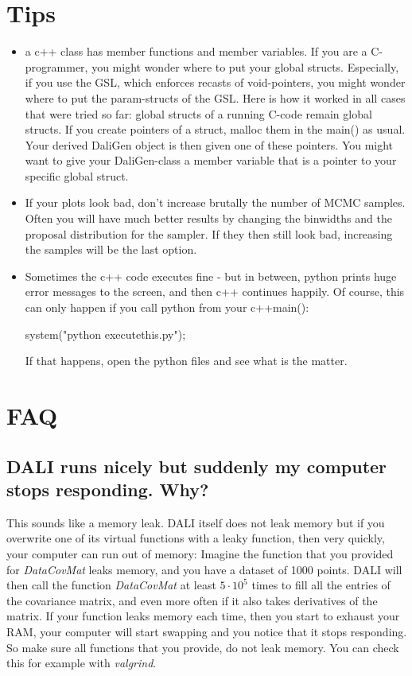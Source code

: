 \documentclass[12pt,twoside]{extarticle}
\newenvironment{file}{\begin{fBox}}{\hfill{\color{dalifile}}\end{fBox}}
\begin{document}
\section{Tips}
\begin{itemize}
\item a c++ class has member functions and member variables. If you are a C-programmer, you might wonder where to put your global structs. Especially, if you use the GSL, which enforces recasts of void-pointers, you might wonder where to put the param-structs of the GSL. Here is how it worked in all cases that were tried so far: global structs of a running C-code remain global structs. If you create pointers of a struct, malloc them in the main() as usual. Your derived DaliGen object is then given one of these pointers. You might want to give your DaliGen-class a member variable that is a pointer to your specific global struct.
 \item If your plots look bad, don't increase brutally the number of MCMC samples. Often you will have much better results by changing the binwidths and the proposal distribution for the sampler. If they then still look bad, increasing the samples will be the last option.
 \item Sometimes the c++ code executes fine - but in between, python prints huge error messages to the screen, and then c++ continues happily. Of course, this can only happen if you call python from your c++main():
 \begin{file}
  system("python executethis.py");
 \end{file}
If that happens, open the python files and see what is the matter.
\end{itemize}


\section{FAQ}

\subsection{DALI runs nicely but suddenly my computer stops responding. Why?}
This sounds like a memory leak. DALI itself does not leak memory but if you overwrite one of its virtual functions with a leaky function, then very quickly, your computer can run out of memory: Imagine the function that you provided for \emph{DataCovMat} leaks memory, and you have a dataset of 1000 points. DALI will then call the function \emph{DataCovMat} at least $5\cdot 10^5$ times to fill all the entries of the covariance matrix, and even more often if it also takes derivatives of the matrix. If your function leaks memory each time, then you start to exhaust your RAM, your computer will start swapping and you notice that it stops responding. So make sure all functions that you provide, do not leak memory. You can check this for example with \emph{valgrind}.
\end{document}
